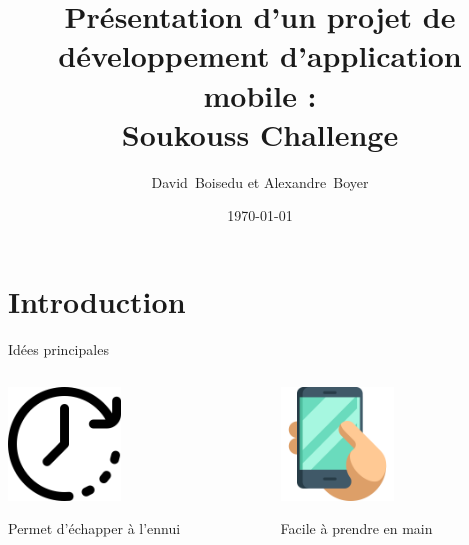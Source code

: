 \documentclass[xcolor=dvipsnames]{beamer}
\title[Dev. Mobiles]{Présentation d'un projet de développement d'application mobile :\\Soukouss Challenge}
\author{David~Boisedu et Alexandre~Boyer}
\institute[]{M1 Informatique}
\date{\today}
\begin{document}

\begin{frame}
    \titlepage
\end{frame}

\section{Introduction}

\begin{frame}{Idées principales}
    \begin{columns}[T]
     \begin{column}[c]{5cm}
        \begin{center}\includegraphics[height=3cm]{Images/wall-clock.png}
        \end{center}
        \begin{center} Permet d'échapper à l'ennui
        \end{center}
     \end{column}
     \begin{column}[c]{5cm}
     \begin{center}\includegraphics[height=3cm]{Images/hand_phone.png}
        \end{center}
        \begin{center} Facile à prendre en main
        \end{center}
     \end{column}
     \end{columns}
\end{frame}
\end{document}
